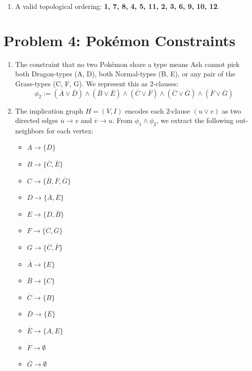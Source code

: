 \documentclass[11pt]{article}
\begin{document}
\begin{enumerate}[label=\textbf{(\alph*)}]
    \item A valid topological ordering: \textbf{1, 7, 8, 4, 5, 11, 2, 3, 6, 9, 10, 12}.
\end{enumerate}

\newpage

\section*{Problem 4: Pokémon Constraints}

\begin{enumerate}[label=\textbf{(\alph*)}]
    \item The constraint that no two Pokémon share a type means Ash cannot pick both Dragon-types (A, D), both Normal-types (B, E), or any pair of the Grass-types (C, F, G). We represent this as 2-clauses:
    $$\phi_2 := (\overline{A} \lor \overline{D}) \land (\overline{B} \lor \overline{E}) \land (\overline{C} \lor \overline{F}) \land (\overline{C} \lor \overline{G}) \land (\overline{F} \lor \overline{G})$$
    
    \item The implication graph $H = (V, I)$ encodes each 2-clause $(u \lor v)$ as two directed edges $\overline{u} \to v$ and $\overline{v} \to u$.
    From $\phi_1 \land \phi_2$, we extract the following out-neighbors for each vertex:
    \begin{itemize}
        \item $A \to \{\overline{D}\}$
        \item $B \to \{\overline{C}, \overline{E}\}$
        \item $C \to \{\overline{B}, \overline{F}, \overline{G}\}$
        \item $D \to \{\overline{A}, \overline{E}\}$
        \item $E \to \{D, \overline{B}\}$
        \item $F \to \{\overline{C}, \overline{G}\}$
        \item $G \to \{\overline{C}, \overline{F}\}$
        \item $\overline{A} \to \{E\}$
        \item $\overline{B} \to \{C\}$
        \item $\overline{C} \to \{B\}$
        \item $\overline{D} \to \{\overline{E}\}$
        \item $\overline{E} \to \{A, E\}$
        \item $\overline{F} \to \emptyset$
        \item $\overline{G} \to \emptyset$
    \end{itemize}


\end{enumerate}
\end{document}
